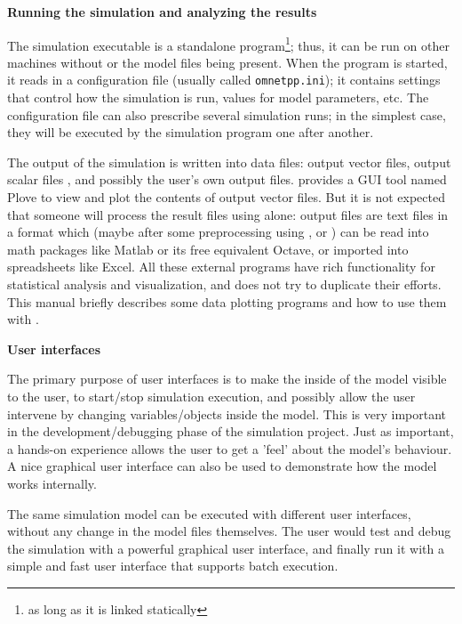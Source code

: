\textbf{Running the simulation and analyzing the results}

The simulation executable is a standalone program\footnote{as long as
  it is linked statically}; thus, it can be run on other machines
without {\opp} or the model files being present. When the program is
started, it reads in a configuration
file (usually called
\texttt{omnetpp.ini}); it contains settings that
control how the simulation is run, values for model parameters, etc.
The configuration file can also prescribe several simulation runs; in
the simplest case, they will be executed by the simulation program one
after another.

The output of the simulation is written into data files: output vector
files, output scalar files
, and possibly the user's own output files.
{\opp} provides a GUI tool named Plove to view and plot the contents
of output vector files. But it is not expected that someone will
process the result files using {\opp} alone: output files are text
files in a format which (maybe after some preprocessing using
,  or ) can be read into math
packages like Matlab or its free equivalent Octave, or imported into
spreadsheets like Excel. All these external programs have rich
functionality for statistical analysis and visualization, and {\opp}
does not try to duplicate their efforts. This manual briefly describes
some data plotting programs and how to use them with {\opp}.


\textbf{User interfaces}

The primary purpose of user interfaces is to make the inside 
of the model visible to the user, to start/stop simulation execution, 
and possibly allow the user intervene by changing variables/objects 
inside the model. This is very important in the development/debugging 
phase of the simulation project. Just as important, a hands-on 
experience allows the user to get a 'feel' about the model's 
behaviour. A nice graphical user interface can also be used to 
demonstrate how the model works internally.


The same simulation model can be executed with different user 
interfaces, without any change in the model files themselves. 
The user would test and debug the simulation with a powerful 
graphical user interface, and finally run it with a simple and 
fast user interface that supports batch execution.


